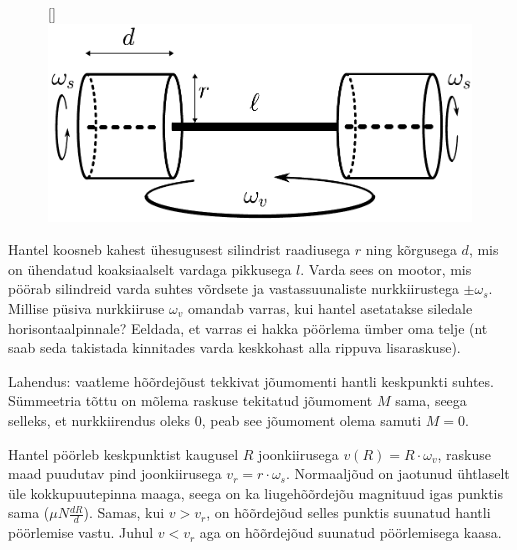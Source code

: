 
\begin{figure}
\raisebox{0pt}[\dimexpr{}\baselineskip\relax]{\includegraphics[scale=0.37]{2022-lahg-10-yl.pdf}}
\vspace{-15pt}
\end{figure}
Hantel koosneb kahest ühesugusest silindrist raadiusega $r$ ning kõrgusega $d$, mis on ühendatud koaksiaalselt vardaga pikkusega $l$. Varda sees on mootor, mis pöörab silindreid varda suhtes võrdsete ja vastassuunaliste nurkkiirustega $\pm \omega_s$. Millise püsiva nurkkiiruse $\omega_v$ omandab varras, kui hantel asetatakse siledale horisontaalpinnale? Eeldada, et varras ei hakka pöörlema ümber oma telje (nt saab seda takistada kinnitades varda keskkohast alla rippuva lisaraskuse).


\hint

\solu
Lahendus: vaatleme hõõrdejõust tekkivat jõumomenti hantli keskpunkti suhtes. Sümmeetria tõttu on mõlema raskuse tekitatud jõumoment $M$ sama, seega selleks, et nurkkiirendus oleks $0$, peab see jõumoment olema samuti $M = 0$.

Hantel pöörleb keskpunktist kaugusel $R$ joonkiirusega $v(R) = R \cdot \omega_v$, raskuse maad puudutav pind joonkiirusega $v_r = r \cdot \omega_s$. Normaaljõud on jaotunud ühtlaselt üle kokkupuutepinna maaga, seega on ka liugehõõrdejõu magnituud igas punktis sama ($\mu N \frac{dR}{d}$). Samas, kui $v > v_r$, on hõõrdejõud selles punktis suunatud hantli pöörlemise vastu. Juhul $v < v_r$ aga on hõõrdejõud suunatud pöörlemisega kaasa.


